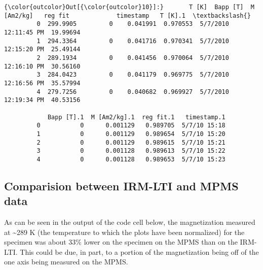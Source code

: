\documentclass{article}
\begin{document}
            \begin{Verbatim}[commandchars=\\\{\}]
{\color{outcolor}Out[{\color{outcolor}10}]:}       T [K]  Bapp [T]  M [Am2/kg]   reg fit             timestamp   T [K].1  \textbackslash{}
         0  299.9905         0    0.041991  0.970553  5/7/2010 12:11:45 PM  19.99694   
         1  294.3364         0    0.041716  0.970341  5/7/2010 12:15:20 PM  25.49144   
         2  289.1934         0    0.041456  0.970064  5/7/2010 12:16:10 PM  30.56160   
         3  284.0423         0    0.041179  0.969775  5/7/2010 12:16:56 PM  35.57994   
         4  279.7256         0    0.040682  0.969927  5/7/2010 12:19:34 PM  40.53156   
         
            Bapp [T].1  M [Am2/kg].1  reg fit.1   timestamp.1  
         0           0      0.001129   0.989705  5/7/10 15:18  
         1           0      0.001129   0.989654  5/7/10 15:20  
         2           0      0.001129   0.989615  5/7/10 15:21  
         3           0      0.001128   0.989613  5/7/10 15:22  
         4           0      0.001128   0.989653  5/7/10 15:23  
\end{Verbatim}
        

    \subsection{Comparision between IRM-LTI and MPMS data}


    As can be seen in the output of the code cell below, the magnetization
measured at \textasciitilde{}289 K (the temperature to which the plots
have been normalized) for the specimen was about 33\% lower on the
specimen on the MPMS than on the IRM-LTI. This could be due, in part, to
a portion of the magnetization being off of the one axis being measured
on the MPMS.
\end{document}
